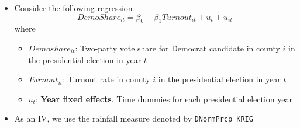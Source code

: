 \documentclass[]{book}
\providecommand{\tightlist}{%
  \setlength{\itemsep}{0pt}\setlength{\parskip}{0pt}}
\begin{document}
\begin{itemize}
\tightlist
\item
  Consider the following regression \[
  DemoShare_{it} = \beta_0 + \beta_1 Turnout_{it} + u_t + u_{it}
   \] where

  \begin{itemize}
  \tightlist
  \item
    \(Demoshare_{it}\): Two-party vote share for Democrat candidate in
    county \(i\) in the presidential election in year \(t\)
  \item
    \(Turnout_{it}\): Turnout rate in county \(i\) in the presidential
    election in year \(t\)
  \item
    \(u_t\): \textbf{Year fixed effects}. Time dummies for each
    presidential election year
  \end{itemize}
\item
  As an IV, we use the rainfall measure denoted by
  \texttt{DNormPrcp\_KRIG}
\end{itemize}
\end{document}
